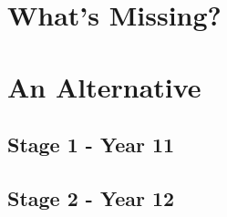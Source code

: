 \documentclass[11pt]{report}
\begin{document}
\chapter{What's Missing?}




\chapter{An Alternative}
\section{Stage 1 - Year 11}




\section{Stage 2 - Year 12}
\end{document}
